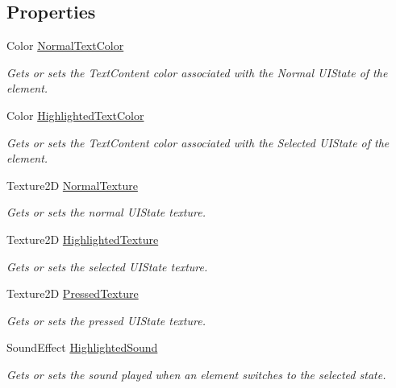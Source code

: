 \subsection*{Properties}
\begin{DoxyCompactItemize}
\item 
Color \hyperlink{class_m_b2_d_1_1_u_i_1_1_u_i_control_element_a3f7eb009aa193cb3daf4057290b7d4ce}{Normal\+Text\+Color}
\begin{DoxyCompactList}\small\item\em Gets or sets the Text\+Content color associated with the Normal U\+I\+State of the element. \end{DoxyCompactList}\item 
Color \hyperlink{class_m_b2_d_1_1_u_i_1_1_u_i_control_element_aab215aee6dcf8827149dbfcb3721db89}{Highlighted\+Text\+Color}
\begin{DoxyCompactList}\small\item\em Gets or sets the Text\+Content color associated with the Selected U\+I\+State of the element. \end{DoxyCompactList}\item 
Texture2D \hyperlink{class_m_b2_d_1_1_u_i_1_1_u_i_control_element_aa0a258c82660be7625aa011fe038095c}{Normal\+Texture}
\begin{DoxyCompactList}\small\item\em Gets or sets the normal U\+I\+State texture. \end{DoxyCompactList}\item 
Texture2D \hyperlink{class_m_b2_d_1_1_u_i_1_1_u_i_control_element_a0caea5b8e0a7b1af0a18bafff1d986b0}{Highlighted\+Texture}
\begin{DoxyCompactList}\small\item\em Gets or sets the selected U\+I\+State texture. \end{DoxyCompactList}\item 
Texture2D \hyperlink{class_m_b2_d_1_1_u_i_1_1_u_i_control_element_a67a317960e2c07d7871568eba8073025}{Pressed\+Texture}
\begin{DoxyCompactList}\small\item\em Gets or sets the pressed U\+I\+State texture. \end{DoxyCompactList}\item 
Sound\+Effect \hyperlink{class_m_b2_d_1_1_u_i_1_1_u_i_control_element_abc0d689a5a22fe884d243f25141df360}{Highlighted\+Sound}
\begin{DoxyCompactList}\small\item\em Gets or sets the sound played when an element switches to the selected state. \end{DoxyCompactList}\end{DoxyCompactItemize}
